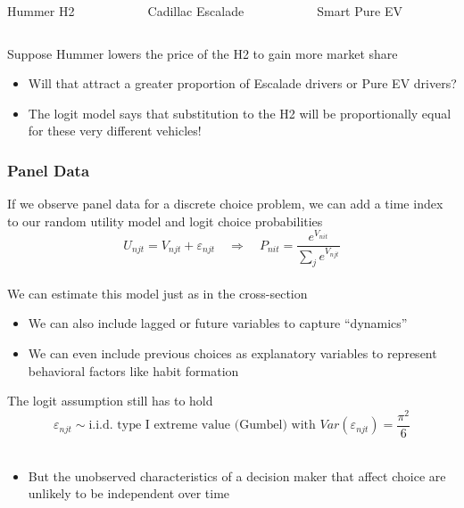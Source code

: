 \documentclass{beamer}
\begin{document}
\begin{frame}
\begin{columns}
\begin{column}{0.333\textwidth}
    	\end{column}
    \end{columns}
    \begin{columns}
    	\begin{column}{0.333\textwidth}
    		\centering Hummer H2
    	\end{column}
    	\begin{column}{0.333\textwidth}
    		\centering Cadillac Escalade
    	\end{column}
    	\begin{column}{0.333\textwidth}
    		\centering Smart Pure EV
    	\end{column}
    \end{columns}
    \vspace{3ex}
    Suppose Hummer lowers the price of the H2 to gain more market share
    \begin{itemize}
    	\item Will that attract a greater proportion of Escalade drivers or Pure EV drivers?
    	\item The logit model says that substitution to the H2 will be proportionally equal for these very different vehicles!
    \end{itemize}
\end{frame}

\begin{frame}\frametitle{Panel Data}
    If we observe panel data for a discrete choice problem, we can add a time index to our random utility model and logit choice probabilities
    $$U_{njt} = V_{njt} + \varepsilon_{njt} \quad \Rightarrow \quad P_{nit} = \frac{e^{V_{nit}}}{\sum_j e^{V_{njt}}}$$ \\
    \vspace{2ex}
    We can estimate this model just as in the cross-section
    \begin{itemize}
    	\item We can also include lagged or future variables to capture ``dynamics''
    	\item We can even include previous choices as explanatory variables to represent behavioral factors like habit formation
    \end{itemize}
    \vspace{2ex}
    The logit assumption still has to hold
    $$\varepsilon_{njt} \sim \text{i.i.d.\ type I extreme value (Gumbel) with } Var(\varepsilon_{njt}) = \frac{\pi^2}{6}$$ \\
    \begin{itemize}
    	\item But the unobserved characteristics of a decision maker that affect choice are unlikely to be independent over time
    \end{itemize}
\end{frame}
\end{document}
